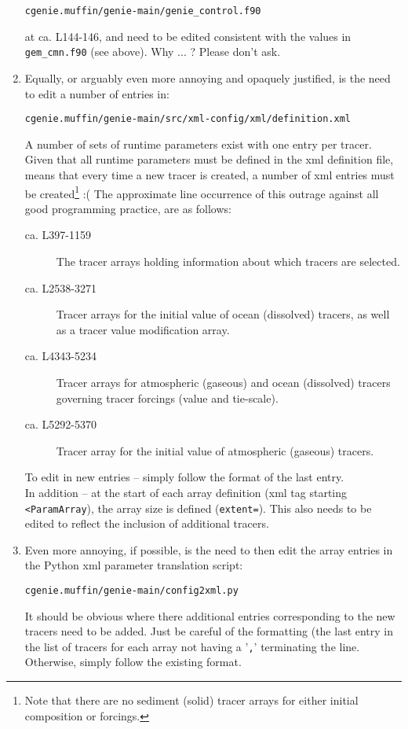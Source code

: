 \documentclass[10pt,twoside]{article}
\begin{document}
\begin{enumerate}
\begin{verbatim}
cgenie.muffin/genie-main/genie_control.f90
\end{verbatim}\vspace{-10pt}
at ca. L144-146, and need to be edited consistent with the values in \texttt{gem\_cmn.f90} (see above). Why ... ? Please don't ask.
\item
Equally, or arguably even more annoying and opaquely justified, is the need to edit a number of entries in:
\vspace{-10pt}\begin{verbatim}
cgenie.muffin/genie-main/src/xml-config/xml/definition.xml
\end{verbatim}\vspace{-10pt}
A number of sets of runtime parameters exist with one entry per tracer. Given that all runtime parameters must be defined in the xml definition file, means that every time a new tracer is created, a number of xml entries must be created\footnote{Note that there are no sediment (solid) tracer arrays for either initial composition or forcings.} :( The approximate line occurrence of this outrage against all good programming practice, are as follows:
\begin{description}
\item[ca. L397-1159] The tracer arrays holding information about which tracers are selected.
\item[ca. L2538-3271] Tracer arrays for the initial value of ocean (dissolved) tracers, as well as a tracer value modification array.
\item[ca. L4343-5234] Tracer arrays for atmospheric (gaseous) and ocean (dissolved) tracers governing tracer forcings (value and tie-scale).
\item[ca. L5292-5370] Tracer array for the initial value of atmospheric (gaseous) tracers.
\end{description}
To edit in new entries -- simply follow the format of the last entry.
\\In addition -- at the start of each array definition (xml tag starting \texttt{<ParamArray}), the array size is defined (\texttt{extent=}). This also needs to be edited to reflect the inclusion of additional tracers.
\item Even more annoying, if possible, is the need to then edit the array entries in the Python xml parameter translation script:
\vspace{-10pt}\begin{verbatim}
cgenie.muffin/genie-main/config2xml.py
\end{verbatim}\vspace{-10pt}
It should be obvious where there additional entries corresponding to the new tracers need to be added. Just be careful of the formatting (the last entry in the list of tracers for each array not having a '\texttt{,}' terminating the line. Otherwise, simply follow the existing format.
\end{enumerate}
\end{document}
